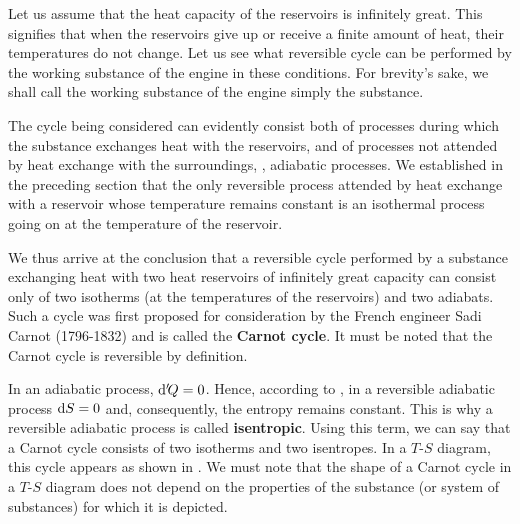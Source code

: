Let us assume that the heat capacity of the reservoirs is infinitely great. This signifies that when the reservoirs give up or receive a finite amount of heat, their temperatures do not change. Let us see what reversible cycle can be performed by the working substance of the engine in these conditions. For brevity's sake, we shall call the working substance of the engine simply the substance.

The cycle being considered can evidently consist both of processes during which the substance exchanges heat with the reservoirs, and of processes not attended by heat exchange with the surroundings, \ie, adiabatic processes. We established in the preceding section that the only reversible process attended by heat exchange with a reservoir whose temperature remains constant is an isothermal process going on at the temperature of the reservoir.

We thus arrive at the conclusion that a reversible cycle performed by a substance exchanging heat with two heat reservoirs of infinitely great capacity can consist only of two isotherms (at the temperatures of the reservoirs) and two adiabats. Such a cycle was first proposed for consideration by the French engineer Sadi Carnot (1796-1832) and is called the \textbf{Carnot cycle}. It must be noted that the Carnot cycle is reversible by definition.

In an adiabatic process, $\mathrm{d}'\!Q=0$. Hence, according to , in a reversible adiabatic process $\mathrm{d} S=0$ and, consequently, the entropy remains constant. This is why a reversible adiabatic process is called \textbf{isentropic}. Using this term, we can say that a Carnot cycle consists of two isotherms and two isentropes. In a $T$-$S$ diagram, this cycle appears as shown in . We must note that the shape of a Carnot cycle in a $T$-$S$ diagram does not depend on the properties of the substance (or system of substances) for which it is depicted.

